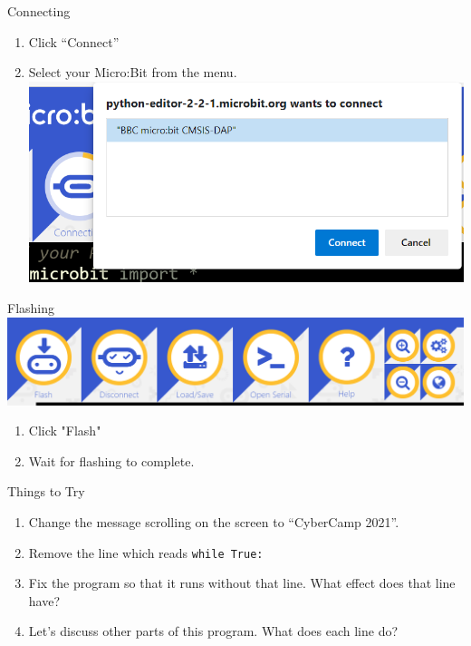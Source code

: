\documentclass[handout]{beamer}
\begin{document}
\begin{frame}{Connecting}
    \begin{enumerate}
        \item Click ``Connect''
        \item Select your Micro:Bit from the menu.
        \includegraphics[max height=0.5\textheight]{images/connect}
    \end{enumerate}
\end{frame}

\begin{frame}{Flashing}
    \includegraphics[max width=\textwidth]{images/connected-toolbar}
    \begin{enumerate}
        \item Click "Flash"
        \item Wait for flashing to complete.
    \end{enumerate}
\end{frame}

\begin{frame}{Things to Try}
    \begin{enumerate}
        \item Change the message scrolling on the screen to ``CyberCamp 2021''.
        \item Remove the line which reads \texttt{while True:}
        \item Fix the program so that it runs without that line. What effect does that line have?
        \item Let's discuss other parts of this program. What does each line do?
    \end{enumerate}
\end{frame}
\end{document}
